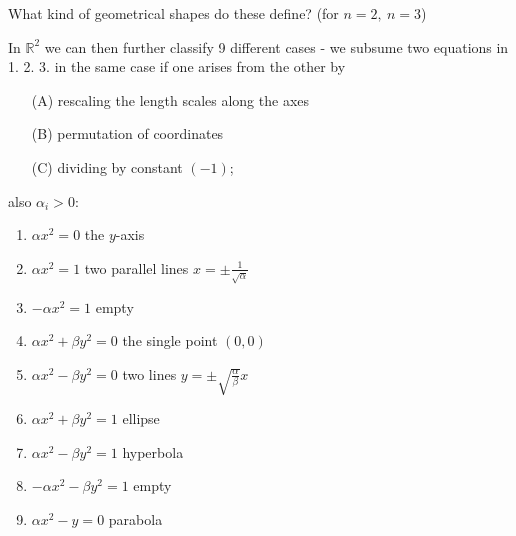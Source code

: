 \documentclass[a4paper]{article}
\theoremstyle{definition}
\begin{document}
What kind of geometrical shapes do these define? (for $n=2,\ n=3$)

In $\mathbb R^2$ we can then further classify 9 different cases - we subsume two equations in 1. 2. 3. in the same case if one arises from the other by
\begin{enumerate}
    \item[(A)] rescaling the length scales along the axes
    \item[(B)] permutation of coordinates
    \item[(C)] dividing by constant $(-1)$;
\end{enumerate}
also $\alpha_i>0$:
\begin{enumerate}
    \item $\alpha x^2=0$ \qquad the $y$-axis
    \item $\alpha x^2=1$ \qquad two parallel lines $x=\pm \frac{1}{\sqrt \alpha}$
    \item $-\alpha x^2=1$ \qquad empty
    \item $\alpha x^2+\beta y^2=0$ \qquad the single point $(0,0)$
    \item $\alpha x^2-\beta y^2=0$ \qquad two lines $y=\pm \sqrt{\frac{\alpha}{\beta}}x$
    \item $\alpha x^2+\beta y^2=1$ \qquad ellipse
    \item $\alpha x^2-\beta y^2=1$ \qquad hyperbola
    \item $-\alpha x^2-\beta y^2=1$ \qquad empty
    \item $\alpha x^2-y=0$ \qquad parabola
\end{enumerate}
\end{document}
